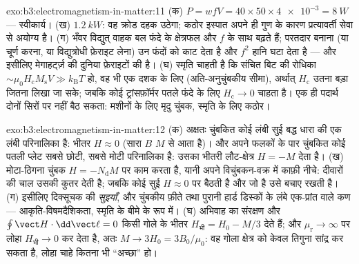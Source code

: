 \begin{solution}{exo:b3:electromagnetism-in-matter:11}
(क) $P = wfV = 40\times50\times\num{4e-3} = \qty{8}{W}$ ---
स्वीकार्य। (ख) $\qty{1.2}{kW}$: वह क्रोड दहक उठेगा; कठोर इस्पात
अपने ही गुण के कारण प्रत्यावर्ती सेवा से अयोग्य है। (ग) भँवर विद्युत्
वाहक बल फंदे के क्षेत्रफल और $f$ के साथ बढ़ते हैं; परतदार बनाना (या
चूर्ण करना, या विद्युत्रोधी फ़ेराइट लेना) उन फंदों को काट देता है और
$f^2$ हानि घटा देता है --- और इसीलिए मेगाहर्ट्ज़ की दुनिया फ़ेराइटों
की है। (घ) स्मृति चाहती है कि संचित बिट की रोधिका
$\sim\mu_0H_{\text{c}}M_{\text{s}}V \gg
k_{\text{B}}T$ हो, वह भी एक दशक के लिए (अति-अनुचुंबकीय सीमा), अर्थात्
$H_{\text{c}}$ उतना बड़ा जितना लिखा जा सके; जबकि कोई ट्रांसफ़ॉर्मर
पतले फंदे के लिए $H_{\text{c}} \to 0$ चाहता है। एक ही पदार्थ दोनों
सिरों पर नहीं बैठ सकता: मशीनों के लिए मृदु चुंबक, स्मृति के लिए कठोर।
\end{solution}

\begin{solution}{exo:b3:electromagnetism-in-matter:12}
(क) अक्षतः चुंबकित कोई लंबी सुई बद्ध धारा की एक लंबी परिनालिका है:
भीतर $H \approx 0$ (सारा $B$ $M$ से आता है)। और अपने फलकों के पार
चुंबकित कोई पतली प्लेट सबसे छोटी, सबसे मोटी परिनालिका है: उसका भीतरी
लौट-क्षेत्र $H = -M$ देता है। (ख)
मोटा-ठिगना चुंबक $H = -N_{\text{d}}M$ पर काम करता है, यानी अपने
विचुंबकन-वक्र में काफ़ी नीचे: दीवारों की चाल उसकी  कुतर देती
है; जबकि कोई सुई $H \approx 0$ पर बैठती है और जो है उसे बचाए रखती
है। (ग) इसीलिए दिक्सूचक की \emph{सुइयाँ}, और चुंबकीय फ़ीते तथा पुरानी
हार्ड डिस्कों के लंबे एक-प्रांत वाले कण --- आकृति-विषमदैशिकता,
स्मृति के बीमे के रूप में। (घ) अभिवाह का संरक्षण और $\oint\vect H\cdot
\dd\vect\ell = 0$ किसी गोले के भीतर $H_{\text{भी}} =
H_0 - M/3$ देते हैं; और $\mu_{\text{r}}\to\infty$ पर लोहा
$H_{\text{भी}}\to0$ कर देता है, अतः $M \to 3H_0 = 3B_0/\mu_0$: वह
गोला क्षेत्र को केवल तिगुना सांद्र कर सकता है, लोहा चाहे कितना भी
``अच्छा'' हो।
\end{solution}

